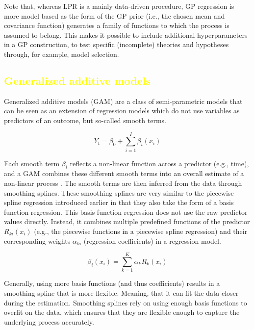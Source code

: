 \documentclass[man, floatsintext]{apa7}
\begin{document}
Note that, whereas LPR is a mainly data-driven procedure, GP regression is more
model based as the form of the GP prior (i.e., the chosen mean and covariance
function) generates a family of functions to which the process is assumed to
belong. This makes it possible to include additional hyperparameters in a GP
construction, to test specific (incomplete) theories and hypotheses through,
for example, model selection.

\subsection{\textcolor{yellow}{Generalized additive models}}

Generalized additive models (GAM) are a class of semi-parametric models that
can be seen as an extension of regression models which do not use variables as
predictors of an outcome, but so-called smooth terms.

\begin{equation}
  Y_t = \beta_0 + \sum_{i = 1}^{I} \beta_i(x_i)
\end{equation}

Each smooth term $\beta_i$ reflects a non-linear function across a predictor
(e.g., time), and a GAM combines these different smooth terms into an overall
estimate of a non-linear process \parencite{wood_generalized_2006,
  wood_inference_2020, hastie_generalized_1999}. The smooth terms are then
inferred from the data through smoothing splines. These smoothing splines are
very similar to the piecewise spline regression introduced earlier in that they
also take the form of a basis function regression. This basis function
regression does not use the raw predictor values directly.
Instead, it combines multiple predefined functions of the predictor
$R_{ki}(x_i)$ (e.g., the piecewise functions in a piecewise spline regression)
and their corresponding weights $\alpha_{ki}$ (regression coefficients) in a
regression model.

\begin{equation}
  \beta_i(x_i) = \sum^K_{k = 1} \alpha_k R_k(x_i)
\end{equation}

\noindent Generally, using more basis functions (and thus coefficients) results
in a smoothing spline that is more flexible. Meaning, that it can fit the data
closer during the estimation. Smoothing splines rely on using enough basis
functions to overfit on the data, which ensures that they are flexible enough
to capture the underlying process accurately.
\end{document}
